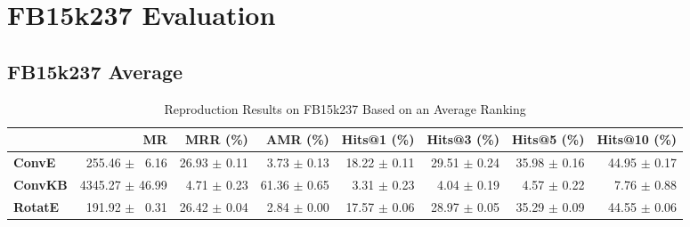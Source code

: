 \documentclass[journal]{IEEEtran}
\begin{document}
\begin{table*}

    \end{table*}

\section{FB15k237 Evaluation}
\subsection{FB15k237 Average}
\begin{table*}
    \caption{Reproduction Results on FB15k237 Based on an Average Ranking}
    \label{tab:fb15k237_full_results_average_ranking}
    \centering
    \begin{tabular}{lrrrrrrr}
\toprule
{} &               MR &      MRR (\%) &      AMR (\%) &   Hits@1 (\%) &   Hits@3 (\%) &   Hits@5 (\%) &  Hits@10 (\%) \\
\midrule
\textbf{ConvE } &  $\phantom{5}$255.46 $\pm$ $\phantom{5}$6.16 &  26.93 $\pm$ 0.11 &  $\phantom{5}$3.73 $\pm$ 0.13 &  18.22 $\pm$ 0.11 &  29.51 $\pm$ 0.24 &  35.98 $\pm$ 0.16 &  44.95 $\pm$ 0.17 \\
\textbf{ConvKB} &  4345.27 $\pm$ 46.99 &  $\phantom{5}$4.71 $\pm$ 0.23 &  61.36 $\pm$ 0.65 &  $\phantom{5}$3.31 $\pm$ 0.23 &  $\phantom{5}$4.04 $\pm$ 0.19 &  $\phantom{5}$4.57 $\pm$ 0.22 &  $\phantom{5}$7.76 $\pm$ 0.88 \\
\textbf{RotatE} &  $\phantom{5}$191.92 $\pm$ $\phantom{5}$0.31 &  26.42 $\pm$ 0.04 &  $\phantom{5}$2.84 $\pm$ 0.00 &  17.57 $\pm$ 0.06 &  28.97 $\pm$ 0.05 &  35.29 $\pm$ 0.09 &  44.55 $\pm$ 0.06 \\
\bottomrule
\end{tabular}

\end{table*}
\end{document}
